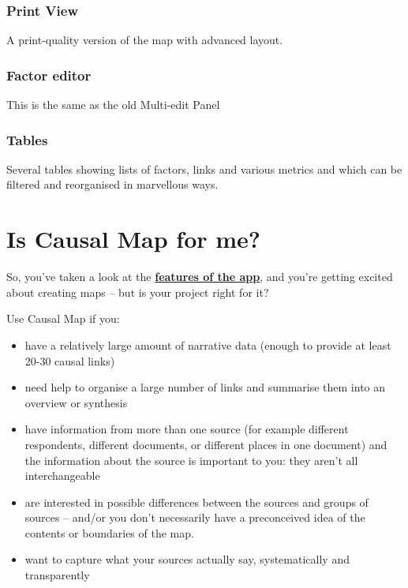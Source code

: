 \documentclass[
]{book}
\providecommand{\tightlist}{%
  \setlength{\itemsep}{0pt}\setlength{\parskip}{0pt}}
\begin{document}
\hypertarget{print-view}{%
\subsection{Print View}\label{print-view}}

A print-quality version of the map with advanced layout.

\hypertarget{factor-editor}{%
\subsection{Factor editor}\label{factor-editor}}

This is the same as the old Multi-edit Panel

\hypertarget{tables}{%
\subsection{Tables}\label{tables}}

Several tables showing lists of factors, links and various metrics and which can be filtered and reorganised in marvellous ways.

\hypertarget{is-causal-map-for-me}{%
\chapter{Is Causal Map for me?}\label{is-causal-map-for-me}}

So, you've taken a look at the \textbf{\href{https://causalmap.app/the-app/}{features of the app}}, and you're getting excited about creating maps -- but is your project right for it?

Use Causal Map if you:

\begin{itemize}
\tightlist
\item
  have a relatively large amount of narrative data (enough to provide at least 20-30 causal links)
\item
  need help to organise a large number of links and summarise them into an overview or synthesis
\item
  have information from more than one source (for example different respondents, different documents, or different places in one document) and the information about the source is important to you: they aren't all interchangeable
\item
  are interested in possible differences between the sources and groups of sources -- and/or you don't necessarily have a preconceived idea of the contents or boundaries of the map.
\item
  want to capture what your sources actually say, systematically and transparently
\end{itemize}
\end{document}
